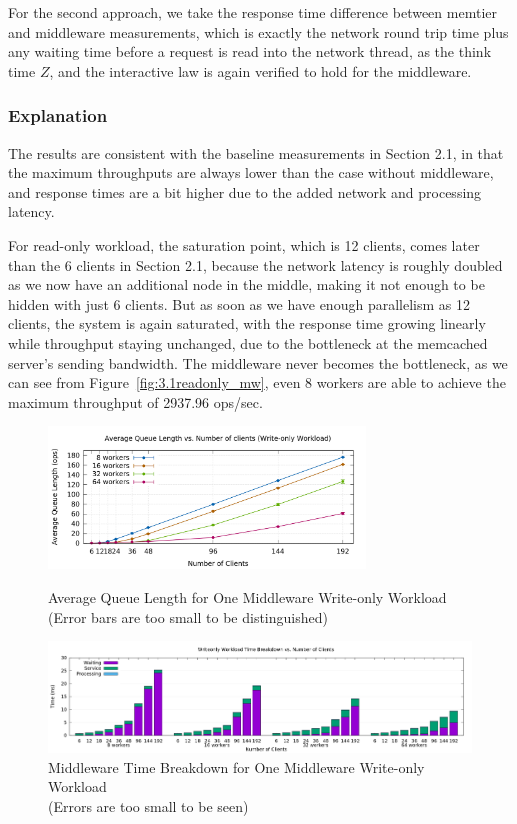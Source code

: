 For the second approach, we take the response time difference between memtier and middleware measurements, which is exactly the network round trip time plus any waiting time before a request is read into the network thread, as the think time $Z$, and the interactive law is again verified to hold for the middleware.


\subsubsection{Explanation}

The results are consistent with the baseline measurements in Section 2.1, in that the maximum throughputs are always lower than the case without middleware, and response times are a bit higher due to the added network and processing latency.

For read-only workload, the saturation point, which is 12 clients, comes later than the 6 clients in Section 2.1, because the network latency is roughly doubled as we now have an additional node in the middle, making it not enough to be hidden with just 6 clients. But as soon as we have enough parallelism as 12 clients, the system is again saturated, with the response time growing linearly while throughput staying unchanged, due to the bottleneck at the memcached server's sending bandwidth. The middleware never becomes the bottleneck, as we can see from Figure~\ref{fig:3.1readonly_mw}, even 8 workers are able to achieve the maximum throughput of 2937.96 ops/sec.

\begin{figure}[!h]
\centering
\includegraphics[width=0.75\textwidth]{img/3_1_queuelen_writeonly.png}
\captionsetup{justification=centering}
\caption{\label{fig:3.1writeonly_queue}Average Queue Length for One Middleware Write-only Workload \\(Error bars are too small to be distinguished)}

\centering
\includegraphics[width=1.0\textwidth]{img/3_1_breakdown_writeonly.png}
\captionsetup{justification=centering}
\caption{\label{fig:3.1writeonly_breakdown}Middleware Time Breakdown for One Middleware Write-only Workload \\(Errors are too small to be seen)}
\end{figure}

